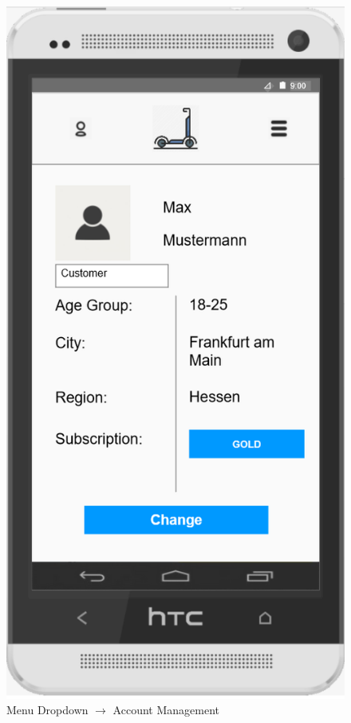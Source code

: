 \documentclass[a4paper, 12pt]{article}
\begin{document}
\begin{figure} [htbp]
  \begin{center}
    \includegraphics[scale=0.75]{images/prototypes/02-01-menu-dropdown--account-management.png}
  \end{center}
  \caption{Menu Dropdown $\rightarrow$ Account Management}
\end{figure}
\end{document}

